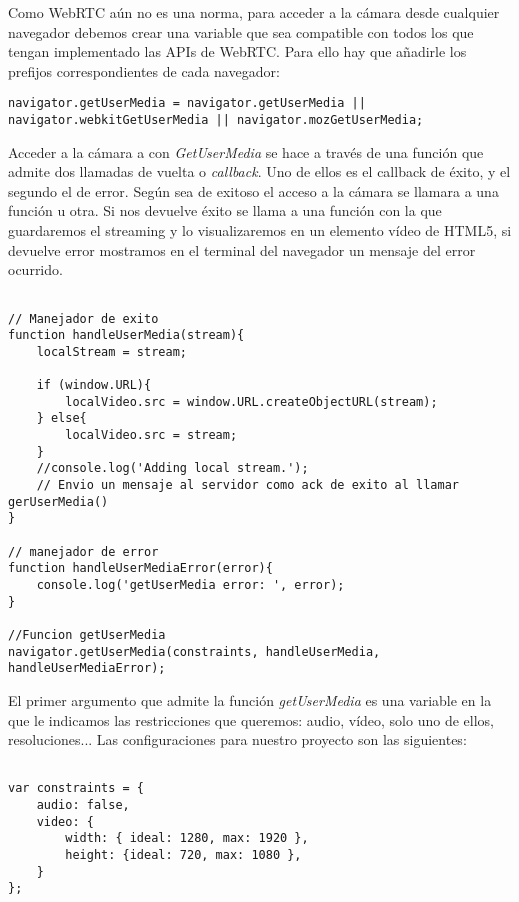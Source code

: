 Como WebRTC aún no es una norma, para acceder a la cámara desde cualquier navegador debemos crear una variable que sea compatible con todos los que tengan implementado las APIs de WebRTC. Para ello hay que añadirle los prefijos correspondientes de cada navegador:\\


\begin{lstlisting}[caption=Variable de getUserMedia.]
navigator.getUserMedia = navigator.getUserMedia || navigator.webkitGetUserMedia || navigator.mozGetUserMedia;
\end{lstlisting}


Acceder a la cámara a con \emph{GetUserMedia} se hace a través de una función que admite dos llamadas de vuelta o \emph{callback}. Uno de ellos es el callback de éxito, y el segundo el de error. Según sea de exitoso el acceso a la cámara se llamara a una función u otra. Si nos devuelve éxito se llama a una función con la que guardaremos el streaming y lo visualizaremos en un elemento vídeo de HTML5, si devuelve error mostramos en el terminal del navegador un mensaje del error ocurrido.\\

\begin{lstlisting}[caption=getUserMedia.]

// Manejador de exito
function handleUserMedia(stream){
	localStream = stream;

	if (window.URL){
		localVideo.src = window.URL.createObjectURL(stream);
	} else{
		localVideo.src = stream;
	}
	//console.log('Adding local stream.');
	// Envio un mensaje al servidor como ack de exito al llamar gerUserMedia()	
}

// manejador de error
function handleUserMediaError(error){
	console.log('getUserMedia error: ', error);
}

//Funcion getUserMedia
navigator.getUserMedia(constraints, handleUserMedia, handleUserMediaError); 

\end{lstlisting}

El primer argumento que admite la función \emph{getUserMedia} es una variable en la que le indicamos las restricciones que queremos: audio, vídeo, solo uno de ellos, resoluciones... Las configuraciones para nuestro proyecto son las siguientes:\\

\begin{lstlisting}[caption=Restricciones de getUserMedia]

var constraints = {
    audio: false,
    video: {
        width: { ideal: 1280, max: 1920 },
        height: {ideal: 720, max: 1080 },
    }
};

\end{lstlisting}

